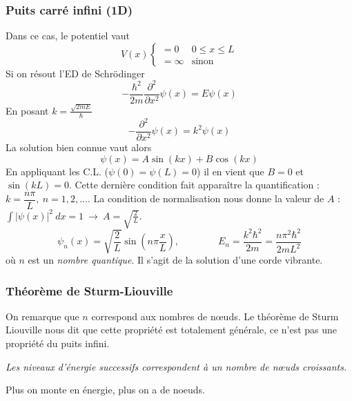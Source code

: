 	\subsubsection{Puits carré infini (1D)}
Dans ce cas, le potentiel vaut
\begin{equation}
V(x) \left\{\begin{array}{ll}
= 0 &0\leq x\leq L\\
=\infty & \text{sinon}
\end{array}\right.
\end{equation}
Si on résout l'ED de Schrödinger
\begin{equation}
-\frac{\hbar^2}{2m}\frac{\partial^2}{\partial x^2}\psi(x) = E\psi(x)
\end{equation}
En posant $k=\frac{\sqrt{2mE}}{\hbar}$
\begin{equation}
-\frac{\partial^2}{\partial x^2}\psi(x) = k^2\psi(x)
\end{equation}
La solution bien connue vaut alors
\begin{equation}
\psi(x) = A\sin(kx) + B\cos(kx)
\end{equation}
En appliquant les C.L. ($\psi(0)=\psi(L)=0$) il en vient que $B=0$ et $\sin(kL)=0$. Cette 
dernière condition fait apparaître la quantification : $k=\dfrac{n\pi}{L},\ n=1,2,\dots$. 
La condition de normalisation nous donne la valeur de $A$ : $\int |\psi(x)|^2\ dx = 1\ \longrightarrow\ 
A = \sqrt{\frac{2}{L}}$.
\begin{equation}
\psi_n(x) =\sqrt{\frac{2}{L}}\sin\left(n\pi\frac{x}{L}\right),\qquad\qquad E_n=\frac{k^2\hbar^2}{2m}=
\frac{n\pi^2\hbar^2}{2mL^2}
\end{equation}
où $n$ est un \textit{nombre quantique}. Il s'agit de la solution d'une corde vibrante. 
		
		\subsubsection{Théorème de Sturm-Liouville}
		On remarque que $n$ correspond aux nombres de nœuds. Le théorème de Sturm Liouville nous dit que 
		cette propriété est totalement générale, ce n'est pas une propriété du puits infini.
		
		\begin{center}
		  \textit{Les niveaux d'énergie 
successifs correspondent à un nombre de nœuds croissants.}
		 \end{center} 
		 Plus on monte en énergie, plus on a de noeuds.\\

